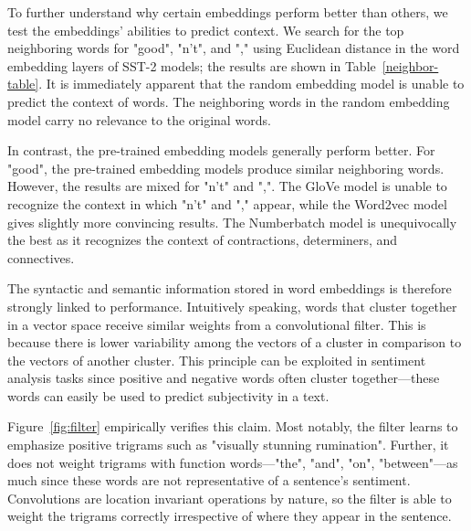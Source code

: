 \documentclass{article}
\begin{document}
To further understand why certain embeddings perform better than others, we test the embeddings' abilities to predict context. We search for the top neighboring words for "good", "n't", and "," using Euclidean distance in the word embedding layers of SST-2 models; the results are shown in Table~\ref{neighbor-table}. It is immediately apparent that the random embedding model is unable to predict the context of words. The neighboring words in the random embedding model carry no relevance to the original words.

In contrast, the pre-trained embedding models generally perform better. For "good", the pre-trained embedding models produce similar neighboring words. However, the results are mixed for "n't" and ",". The GloVe model is unable to recognize the context in which "n't" and "," appear, while the Word2vec model gives slightly more convincing results. The Numberbatch model is unequivocally the best as it recognizes the context of contractions, determiners, and connectives.

The syntactic and semantic information stored in word embeddings is therefore strongly linked to performance. Intuitively speaking, words that cluster together in a vector space receive similar weights from a convolutional filter. This is because there is lower variability among the vectors of a cluster in comparison to the vectors of another cluster. This principle can be exploited in sentiment analysis tasks since positive and negative words often cluster together---these words can easily be used to predict subjectivity in a text.

Figure~\ref{fig:filter} empirically verifies this claim. Most notably, the filter learns to emphasize positive trigrams such as "visually stunning rumination". Further, it does not weight trigrams with function words---"the", "and", "on", "between"---as much since these words are not representative of a sentence's sentiment. Convolutions are location invariant operations by nature, so the filter is able to weight the trigrams correctly irrespective of where they appear in the sentence.
\end{document}

